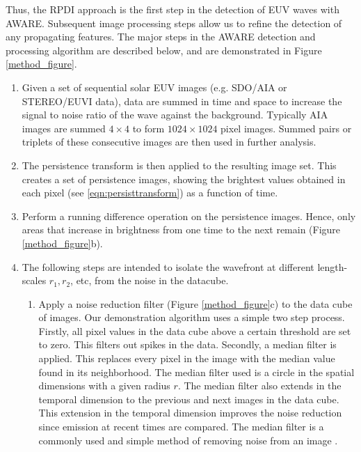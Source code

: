 Thus, the RPDI approach is the first step in the detection of EUV
waves with AWARE. Subsequent image processing steps allow us to refine
the detection of any propagating features. The major steps in the
AWARE detection and processing algorithm are described below, and are
demonstrated in Figure \ref{method_figure}.

\begin{enumerate}

\item Given a set of sequential solar EUV images (e.g. SDO/AIA or
  STEREO/EUVI data), data are summed in time and space to increase the
  signal to noise ratio of the wave against the background.  Typically
  AIA images are summed $4\times4$ to form $1024\times1024$ pixel
  images.  Summed pairs or triplets of these consecutive images are
  then used in further analysis.

\item The persistence transform is then applied to the resulting image
  set.  This creates a set of persistence images, showing the
  brightest values obtained in each pixel (see
  \ref{eqn:persisttransform}) as a function of time.

\item Perform a running difference operation on the
  persistence images. Hence, only areas that increase in brightness
  from one time to the next remain (Figure \ref{method_figure}b).

\item 
The following steps are intended to isolate the wavefront at different
length-scales $r_{1}, r_{2}$\textellipsis, etc, from the noise in the
datacube.

\begin{enumerate}

\item Apply a noise reduction filter (Figure \ref{method_figure}c) to
  the data cube of images.  Our demonstration algorithm uses a simple
  two step process.  Firstly, all pixel values in the data cube above
  a certain threshold are set to zero. This filters out spikes in the
  data. Secondly, a median filter is applied.  This replaces every
  pixel in the image with the median value found in its neighborhood.
  The median filter used is a circle in the spatial dimensions with a
  given radius $r$.  The median filter also extends in the temporal
  dimension to the previous and next images in the data cube.  This
  extension in the temporal dimension improves the noise reduction
  since emission at recent times are compared.  The median filter is a
  commonly used and simple method of removing noise from an image
  \citep{2002dip..book.....G}.


\end{enumerate}
\end{enumerate}
